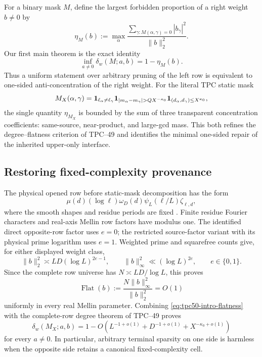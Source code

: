 For a binary mask \(M\), define the largest forbidden proportion of a
right weight \(b\ne0\) by
\begin{equation}
 \eta_M(b)
 :=\max_\alpha
 \frac{\sum_{\gamma:M(\alpha,\gamma)=0}|b_\gamma|^2}
      {\|b\|_2^2}.
 \label{eq:tpc50-intro-eta}
\end{equation}
Our first main theorem is the exact identity
\begin{equation}
 \boxed{
 \inf_{a\ne0}\delta_w(M;a,b)=1-\eta_M(b).}
 \label{eq:tpc50-intro-exact}
\end{equation}
Thus a uniform statement over arbitrary pruning of the left row is
equivalent to one-sided anti-concentration of the right weight.  For
the literal TPC static mask
\begin{equation}
 M_X(\alpha,\gamma)
 =\one_{\ell_\alpha\ne\ell_\gamma}
  \one_{|m_\alpha-m_\gamma|>QX^{-\kappa_0}}
  \one_{(d_\alpha,d_\gamma)\le X^{\kappa_0}},
 \label{eq:tpc50-intro-mask}
\end{equation}
the single quantity \(\eta_{M_X}\) is bounded by the sum of three
transparent concentration coefficients: same-source, near-product,
and large-gcd mass.  This both refines the degree--flatness criterion
of TPC--49 and identifies the minimal one-sided repair of the inherited
upper-only interface.

\subsection{Restoring fixed-complexity provenance}

The physical opened row before static-mask decomposition has the form
\begin{equation}
 \mu(d)(\log\ell)\omega_D(d)\psi_L(\ell/L)\zeta_{\ell,d},
 \label{eq:tpc50-intro-row}
\end{equation}
where the smooth shapes and residue periods are fixed
\citep{WangTPC18,WangTPC25}.  Finite residue Fourier characters and
real-axis Mellin row factors have modulus one.  The identified direct
opposite-row factor uses \(e=0\); the restricted source-factor variant
with its physical prime logarithm uses \(e=1\).  Weighted prime and
squarefree counts give, for either displayed weight class,
\begin{equation}
 \|b\|_2^2\asymp LD(\log L)^{2e-1},
 \qquad
 \|b\|_\infty^2\ll(\log L)^{2e},
 \qquad e\in\{0,1\}.
 \label{eq:tpc50-intro-row-energy}
\end{equation}
Since the complete row universe has
\(N\asymp LD/\log L\), this proves
\begin{equation}
 \operatorname{Flat}(b)
 :=\frac{N\|b\|_\infty^2}{\|b\|_2^2}=O(1)
 \label{eq:tpc50-intro-flatness}
\end{equation}
uniformly in every real Mellin parameter.  Combining
\eqref{eq:tpc50-intro-flatness} with the complete-row degree theorem
of TPC--49 proves
\begin{equation}
 \boxed{
 \delta_w(M_X;a,b)
 =1-O\!\left(L^{-1+o(1)}+D^{-1+o(1)}
                  +X^{-\kappa_0+o(1)}\right)}
 \label{eq:tpc50-intro-positive}
\end{equation}
for every \(a\ne0\).  In particular, arbitrary terminal sparsity on
one side is harmless when the opposite side retains a canonical
fixed-complexity cell.

